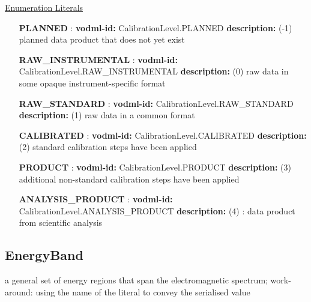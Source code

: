   \noindent \underline{Enumeration Literals}
  \vspace{-\parsep}
  \small
  \begin{itemize}
  
    \item[\textbf{PLANNED}]: \textbf{vodml-id:} CalibrationLevel.PLANNED \newline
          \textbf{description:} (-1) planned data product that does not yet exist
    \item[\textbf{RAW\_INSTRUMENTAL}]: \textbf{vodml-id:} CalibrationLevel.RAW\_INSTRUMENTAL \newline
          \textbf{description:} (0) raw data in some opaque instrument-specific format
    \item[\textbf{RAW\_STANDARD}]: \textbf{vodml-id:} CalibrationLevel.RAW\_STANDARD \newline
          \textbf{description:} (1) raw data in a common format
    \item[\textbf{CALIBRATED}]: \textbf{vodml-id:} CalibrationLevel.CALIBRATED \newline
          \textbf{description:} (2) standard calibration steps have been applied
    \item[\textbf{PRODUCT}]: \textbf{vodml-id:} CalibrationLevel.PRODUCT \newline
          \textbf{description:} (3) additional non-standard calibration steps have been applied
    \item[\textbf{ANALYSIS\_PRODUCT}]: \textbf{vodml-id:} CalibrationLevel.ANALYSIS\_PRODUCT \newline
          \textbf{description:} (4) : data product from scientific analysis
  \end{itemize}
  \normalsize


  \subsection{EnergyBand}
  \label{sect:EnergyBand}

  a general set of energy regions that span the electromagnetic spectrum; work-around: using the name of the literal to convey the serialised value

